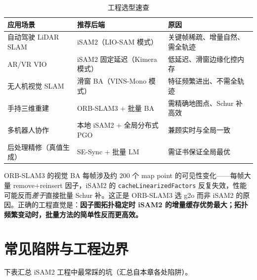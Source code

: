 \begin{table}[H]\centering\small
\caption{工程选型速查}
\label{tab:selection}
\begin{tabular}{lll}
\toprule
应用场景 & 推荐后端 & 原因 \\
\midrule
自动驾驶 LiDAR SLAM & iSAM2（LIO-SAM 模式） & 关键帧稀疏、增量自然、需全轨迹 \\
AR/VR VIO & iSAM2 固定延迟（Kimera 模式） & 低延迟、滑窗边缘化控内存 \\
无人机视觉 SLAM & 滑窗 BA（VINS-Mono 模式） & 特征频繁进出、不需全轨迹 \\
手持三维重建 & ORB-SLAM3 $+$ 批量 BA & 需精确地图点、Schur 补高效 \\
多机器人协作 & 本地 iSAM2 $+$ 全局分布式 PGO & 兼顾实时与全局一致 \\
后处理精修（真值生成） & SE-Sync $+$ 批量 LM & 需证书保证全局最优 \\
\bottomrule
\end{tabular}
\end{table}

\begin{insight}
ORB-SLAM3 的视觉 BA 每帧涉及约 $200$ 个 map point 的可见性变化——每帧大量 remove$+$reinsert 因子，iSAM2 的 \texttt{cacheLinearizedFactors} 反复失效，性能可能反而\emph{差于}直接批量 Schur 补。这正是 ORB-SLAM3 选 g2o 而非 iSAM2 的原因。正确的工程直觉是：\textbf{因子图拓扑稳定时 iSAM2 的增量缓存优势最大；拓扑频繁变动时，批量方法的简单性反而更高效。}
\end{insight}

\section{常见陷阱与工程边界}
\label{sec:isam-pitfalls}

下表汇总 iSAM2 工程中最常踩的坑（汇总自本章各处陷阱）。

